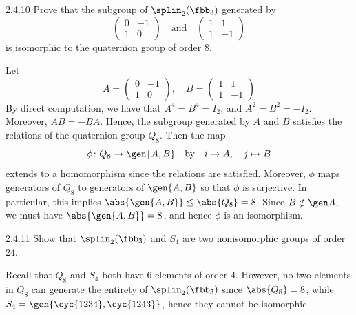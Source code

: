 \begin{exercise}{2.4.10}
    Prove that the subgroup of $\splin_2(\fbb_3)$ generated by
    \[
        \begin{pmatrix}
            0 & -1 \\ 
            1 & 0 
        \end{pmatrix} \quad \text{and} \quad
        \begin{pmatrix}
            1 & 1 \\ 
            1 & -1 
        \end{pmatrix}
    \]
    is isomorphic to the quaternion group of order $8$.
\end{exercise}

\begin{sol}
    Let
    \[
    	A = 
        \begin{pmatrix}
            0 & -1 \\
            1 & 0
        \end{pmatrix}, \quad B = 
        \begin{pmatrix}
            1 & 1 \\
            1 & -1
        \end{pmatrix}
	\]
    By direct computation, we have that $A^4 = B^4 = I_2$, and $A^2 = B^2 = -I_2$.
	Moreover, $AB = -BA$.
	Hence, the subgroup generated by $A$ and $B$ satisfies the relations of the quaternion group $Q_8$.
	Then the map
    \[
    	\phi \colon Q_8 \to \gen{A, B} \quad \text{by} \quad i \mapsto A, \quad j \mapsto B
    \]
    extends to a homomorphism since the relations are satisfied.
	Moreover, $\phi$ maps generators of $Q_8$ to generators of $\gen{A, B}$ so that $\phi$ is surjective.
	In particular, this implies $\abs{\gen{A, B}} \leq \abs{Q_8} = 8$.
	Since $B \notin \gen A$, we must have $\abs{\gen{A, B}} = 8$, and hence $\phi$ is an isomorphism.
\end{sol}

\begin{exercise}{2.4.11}
    Show that $\splin_2(\fbb_3)$ and $S_4$ are two nonisomorphic groups of order $24$.
\end{exercise}

\begin{sol}
    Recall that $Q_8$ and $S_4$ both have 6 elements of order 4.
	However, no two elements in $Q_8$ can generate the entirety of $\splin_2(\fbb_3)$ since $\abs{Q_8} = 8$, while $S_4 = \gen{\cyc{1 2 3 4}, \cyc{1 2 4 3}}$, hence they cannot be isomorphic.
\end{sol}

